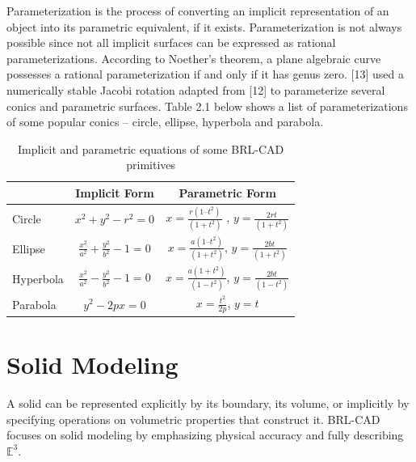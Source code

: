Parameterization is the process of converting an implicit representation of 
an object into its parametric equivalent, if it exists. Parameterization is not
always possible since not all implicit surfaces can be expressed as rational
parameterizations. According to Noether's theorem, a plane algebraic curve
possesses a rational parameterization if and only if it has genus zero. [13] used
a numerically stable Jacobi rotation adapted from [12] to parameterize several
conics and parametric surfaces. Table 2.1 below shows a list of
parameterizations of some popular conics – circle, ellipse, hyperbola and
parabola.
\begin{table}[thbp]
\caption[Implicit and parametric equations of some BRL-­CAD primitives]{Implicit and parametric equations of some BRL­-CAD primitives}
\centering
\begin{tabular}{| l | c | c |}
  \hline
   & Implicit Form & Parametric Form &  \\
  \hline
  Circle & $x^2 + y^2 - r^2 = 0$ &    $x =  \frac{r(1 – t^2)}{(1 + t^2)}$ , $y = \frac{2rt}{(1 + t^2)}$ \\
  \hline
  Ellipse & $\frac{x^2}{a^2} + \frac{y^2}{b^2} - 1 = 0$ &     $x = \frac{a(1 – t^2)}{(1 + t^2)}$, $y = \frac{2bt}{(1 + t^2)}$ \\
  \hline
  Hyperbola & $\frac{x^2}{a^2} - \frac{y^2}{b^2} - 1 = 0$ &     $x = \frac{a(1 + t^2)}{(1 - t^2)}$, $y = \frac{2bt}{(1 - t^2)}$ \\
  \hline
  Parabola & $y^2 - 2px = 0$ &     $ x = \frac{t^2}{2p}$, $ y = t$ \\
  \hline
\end{tabular}
\label{Implicit and Parametric equations}
\end{table}

\clearpage


\section{Solid Modeling}

\hspace{30} A solid can be represented explicitly by its boundary, its volume, or
implicitly by specifying operations on volumetric properties that construct it.
BRL-­CAD focuses on solid modeling by emphasizing physical accuracy and
fully describing $\mathbb{E}^3$.

